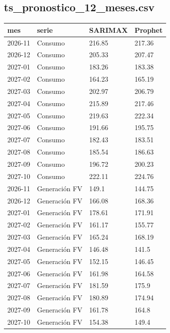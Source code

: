 \subsection*{ts\_pronostico\_12\_meses.csv}
{\footnotesize\begin{longtable}{@{}llll@{}}
\toprule
mes & serie & SARIMAX & Prophet \\
\midrule\endhead
2026-11 & Consumo & 216.85 & 217.36 \\
2026-12 & Consumo & 205.33 & 207.47 \\
2027-01 & Consumo & 183.26 & 183.38 \\
2027-02 & Consumo & 164.23 & 165.19 \\
2027-03 & Consumo & 202.97 & 206.79 \\
2027-04 & Consumo & 215.89 & 217.46 \\
2027-05 & Consumo & 219.63 & 222.34 \\
2027-06 & Consumo & 191.66 & 195.75 \\
2027-07 & Consumo & 182.43 & 183.51 \\
2027-08 & Consumo & 185.54 & 186.63 \\
2027-09 & Consumo & 196.72 & 200.23 \\
2027-10 & Consumo & 222.11 & 224.76 \\
2026-11 & Generación FV & 149.1 & 144.75 \\
2026-12 & Generación FV & 166.08 & 168.36 \\
2027-01 & Generación FV & 178.61 & 171.91 \\
2027-02 & Generación FV & 161.17 & 155.77 \\
2027-03 & Generación FV & 165.24 & 168.19 \\
2027-04 & Generación FV & 146.48 & 141.5 \\
2027-05 & Generación FV & 152.15 & 146.45 \\
2027-06 & Generación FV & 161.98 & 164.58 \\
2027-07 & Generación FV & 181.59 & 175.9 \\
2027-08 & Generación FV & 180.89 & 174.94 \\
2027-09 & Generación FV & 161.78 & 164.8 \\
2027-10 & Generación FV & 154.38 & 149.4 \\
\bottomrule
\end{longtable}}

